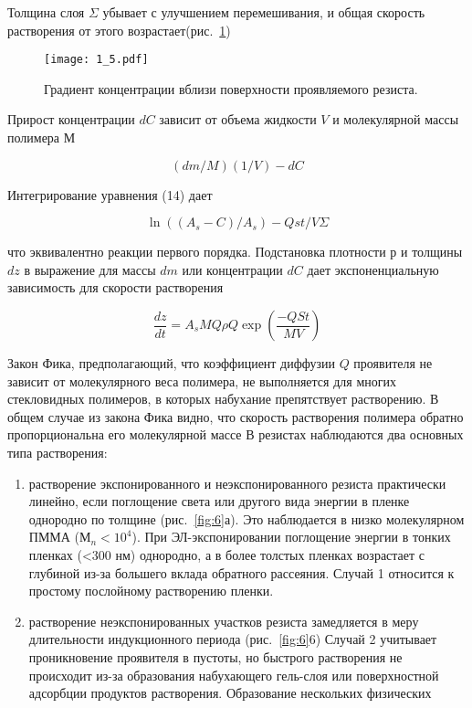 Толщина слоя $\Sigma$ убывает с улучшением перемешивания, и общая скорость растворения от этого возрастает(рис.~\ref{fig:5})

\begin{figure}[H]
\center
\texttt{[image: 1\_5.pdf]}
\caption{Градиент концентрации вблизи поверхности проявляемого резиста.}
\label{fig:5}
\end{figure}

Прирост концентрации $dC$ зависит от объема жидкости $V$ и молекулярной массы полимера $М$

\begin{equation}
(dm/M)(1/V)-dC
\label{eq:A15}
\end{equation}

Интегрирование уравнения (14) дает

\begin{equation}
\ln((A_s-C)/A_s) -Qst/V\Sigma
\label{eq:A16}
\end{equation}

что эквивалентно реакции первого порядка. Подстановка плотности $р$ и толщины $dz$ в выражение для массы $dm$ или концентрации $dC$ дает экспоненциальную зависимость для скорости растворения

\begin{equation}
\frac{dz}{dt} = A_s MQ \rho Q \exp\left(\frac{-QSt}{MV}\right)
\label{eq:A17}
\end{equation}

Закон Фика, предполагающий, что коэффициент диффузии $Q$ проявителя не зависит от молекулярного веса полимера, не выполняется для многих стекловидных полимеров, в которых набухание препятствует растворению.
В общем случае из закона Фика видно, что скорость растворения полимера обратно пропорциональна его молекулярной массе В резистах наблюдаются два основных типа растворения:
\begin{enumerate}
    \item растворение экспонированного и неэкспонированного резиста практически линейно, если поглощение света или другого вида энергии в пленке однородно по толщине (рис.~\ref{fig:6}а). Это наблюдается в низко молекулярном ПММА ($М_n<10^4$). При ЭЛ-экспонировании поглощение энергии в тонких пленках (<300 нм) однородно, а в более толстых пленках возрастает с глубиной из-за большего вклада обратного рассеяния. Случай 1 относится к простому послойному растворению пленки.
    \item растворение неэкспонированных участков резиста замедляется в меру длительности индукционного периода (рис.~\ref{fig:6}6)  Случай 2 учитывает проникновение проявителя в пустоты, но быстрого растворения не происходит из-за образования набухающего гель-слоя или поверхностной адсорбции продуктов растворения. Образование нескольких физических
\end{enumerate}

